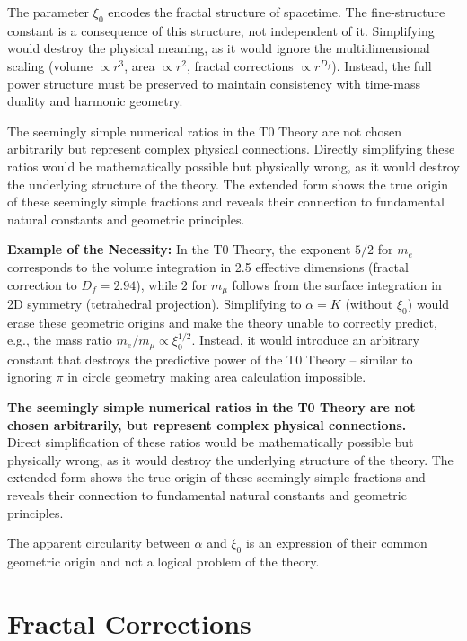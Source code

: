 \documentclass[12pt,a4paper]{article}
\newcommand{\xipar}{\xi_0}
\newcommand{\Dfrak}{D_f}
\begin{document}
	The parameter $\xipar$ encodes the fractal structure of spacetime. The fine-structure constant is a consequence of this structure, not independent of it. Simplifying would destroy the physical meaning, as it would ignore the multidimensional scaling (volume $\propto r^3$, area $\propto r^2$, fractal corrections $\propto r^{\Dfrak}$). Instead, the full power structure must be preserved to maintain consistency with time-mass duality and harmonic geometry.
	
	The seemingly simple numerical ratios in the T0 Theory are not chosen arbitrarily but represent complex physical connections. Directly simplifying these ratios would be mathematically possible but physically wrong, as it would destroy the underlying structure of the theory. The extended form shows the true origin of these seemingly simple fractions and reveals their connection to fundamental natural constants and geometric principles.
	
	\textbf{Example of the Necessity:} In the T0 Theory, the exponent $5/2$ for $m_e$ corresponds to the volume integration in 2.5 effective dimensions (fractal correction to $\Dfrak = 2.94$), while $2$ for $m_\mu$ follows from the surface integration in 2D symmetry (tetrahedral projection). Simplifying to $\alpha = K$ (without $\xipar$) would erase these geometric origins and make the theory unable to correctly predict, e.g., the mass ratio $m_e/m_\mu \propto \xipar^{1/2}$. Instead, it would introduce an arbitrary constant that destroys the predictive power of the T0 Theory – similar to ignoring $\pi$ in circle geometry making area calculation impossible.
	
	\begin{tcolorbox}[colback=blue!5!white,colframe=blue!75!black,title=Key Result]
		\textbf{The seemingly simple numerical ratios in the T0 Theory are not chosen arbitrarily, but represent complex physical connections.} \\
		
		Direct simplification of these ratios would be mathematically possible but physically wrong, as it would destroy the underlying structure of the theory. The extended form shows the true origin of these seemingly simple fractions and reveals their connection to fundamental natural constants and geometric principles.
		
		The apparent circularity between $\alpha$ and $\xipar$ is an expression of their common geometric origin and not a logical problem of the theory.
	\end{tcolorbox}
	\section{Fractal Corrections}
\end{document}
